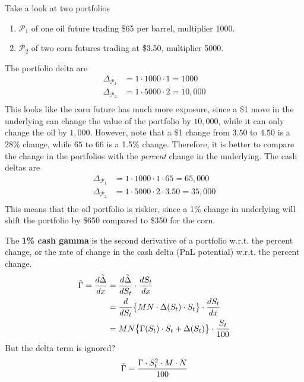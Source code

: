\documentclass{article}
\begin{document}
    \begin{example}
      Take a look at two portfolios  
      \begin{enumerate}
        \item $\mathcal{P}_1$ of one oil future trading \$65 per barrel, multiplier 1000. 
        \item $\mathcal{P}_2$ of two corn futures trading at \$3.50, multiplier 5000. 
      \end{enumerate}
      The portfolio delta are 
      \begin{align}
        \Delta_{\mathcal{P}_1} & = 1 \cdot 1000 \cdot 1 = 1000 \\ 
        \Delta_{\mathcal{P}_2} & = 1 \cdot 5000 \cdot 2 = 10,000 \\ 
      \end{align}
      This looks like the corn future has much more exposure, since a \$1 move in the underlying can change the value of the portfolio by $10,000$, while it can only change the oil by $1,000$. However, note that a \$1 change from $3.50$ to $4.50$ is a 28\% change, while $65$ to $66$ is a 1.5\% change. Therefore, it is better to compare the change in the portfolios with the \textit{percent} change in the underlying. The cash deltas are 
      \begin{align}
        \Delta_{\mathcal{P}_1} & = 1 \cdot 1000 \cdot 1 \cdot 65 = 65,000 \\ 
        \Delta_{\mathcal{P}_2} & = 1 \cdot 5000 \cdot 2 \cdot 3.50 = 35,000 \\ 
      \end{align}
      This means that the oil portfolio is riskier, since a 1\% change in underlying will shift the portfolio by \$650 compared to \$350 for the corn. 
    \end{example}

    \begin{definition}
      The \textbf{1\% cash gamma} is the second derivative of a portfolio w.r.t. the percent change, or the rate of change in the cash delta (PnL potential) w.r.t. the percent change. 
      \begin{align}
        \Tilde{\Gamma} = \frac{d \Tilde{\Delta}}{d x} & = \frac{d \Tilde{\Delta}}{d S_t} \cdot \frac{d S_t}{d x} \\
                                                        & = \frac{d}{d S_t} \big\{ M N \cdot \Delta (S_t) \cdot S_t \big\} \cdot \frac{d S_t}{d x} \\
                                                        & = M N \big\{ \Gamma (S_t) \cdot S_t + \Delta(S_t) \big\} \cdot \frac{S_t}{100}
      \end{align}
      But the delta term is ignored? 
      \begin{equation}
        \Tilde{\Gamma} = \frac{\Gamma \cdot S_t^2 \cdot M \cdot N}{100}
      \end{equation}
    \end{definition}
\end{document}
